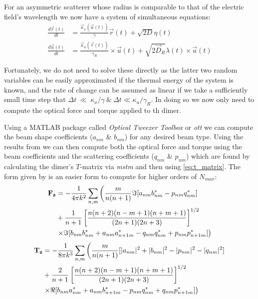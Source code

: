 For an asymmetric scatterer whose radius is comparable to that of the 
electric field's wavelength we now have a system of simultaneous equations:
\begin{align}
	\label{eq:full_langevin}
  \frac{{d}\vec{r}(t)}{{dt}}
  &=
    \frac{\vec{\kappa}_x(\vec{u}(t))}{\gamma}\vec{r}(t) + \sqrt{2D}\eta(t)
  \\
  \frac{{d}\vec{u}(t)}{{dt}}
  &=
    \frac{\vec{\kappa}_u(\vec{r}(t))}{\gamma_R}\times \vec{u}(t)
    + \sqrt{2\vec{D}_R}\lambda(t)\times \vec{u}(t)
\end{align}

Fortunately, we do not need to solve these directly as the latter two
random variables can be easily approximated if the thermal energy of
the system is known, and the rate of change can be assumed as linear if
we take a sufficiently small time step that $\Delta t~\ll~\kappa_x/\gamma 
\ \& \ \Delta t \ll \kappa_u/\gamma_R$. In doing so we now only need 
to compute the optical force and torque applied to th dimer. 

Using a  MATLAB package called \textit{Optical Tweezer Toolbox} or \textit{ott} \cite{Nieminen2007} we can compute the beam shape coefficients ($a_{nm}$ \& 
$b_{nm}$) for any desired beam type. Using the results from \cite{Farsund1996} 
we can then compute both the optical force and torque using the beam coefficients 
and the scattering coefficients ($q_{nm}$ \& $p_{nm}$) which are found by 
calculating the dimer's $T$-matrix via \textit{mstm} \cite{Mackowski2011} and 
then using \eqref{eq:t_matrix}. The form given by \cite{Crichton2000THEMD} is 
an easier form to compute for higher orders of $N_{max}$:
\begin{equation}
	\label{eq:optical_force}
\begin{split}
  \bold{F_z}
  &=
    -\frac{1}{4\pi k^2}\sum_{n,m} \left(\frac{m}{n(n+1)}\Im[a_{nm}b^*_{nm}-p_{nm}q^*_{nm}] \right.
  \\ 
  &+\frac{1}{n+1}\left[\frac{n(n+2)(n-m+1)(n+m+1)}{(2n+1)(2n+3)} \right]^{1/2}
  \\
  & \left.\times\Im[b_{nm}b^*_{nm}+a_{nm}a^*_{n+1m}-q_{nm}q^*_{nm}+p_{nm}p^*_{n+1m}] \right)
\end{split}
\end{equation}
\begin{equation}
\begin{split}
  \bold{T_z}
  &=
    -\frac{1}{8\pi k^3}\sum_{n,m} \left(\frac{m}{n(n+1)}[|a_{nm}|^2+|b_{nm}|^2-|p_{nm}|^2-|q_{nm}|^2] \right.
  \\ 
  &+\frac{2}{n+1}\left[\frac{n(n+2)(n-m+1)(n+m+1)}{(2n+1)(2n+3)} \right]^{1/2}
  \\
  & \left.\times\Re[b_{nm}a^*_{nm}+a_{nm}b^*_{n+1m}-p_{nm}q^*_{nm}+q_{nm}p^*_{n+1m}] \right)
\end{split}
\end{equation}

